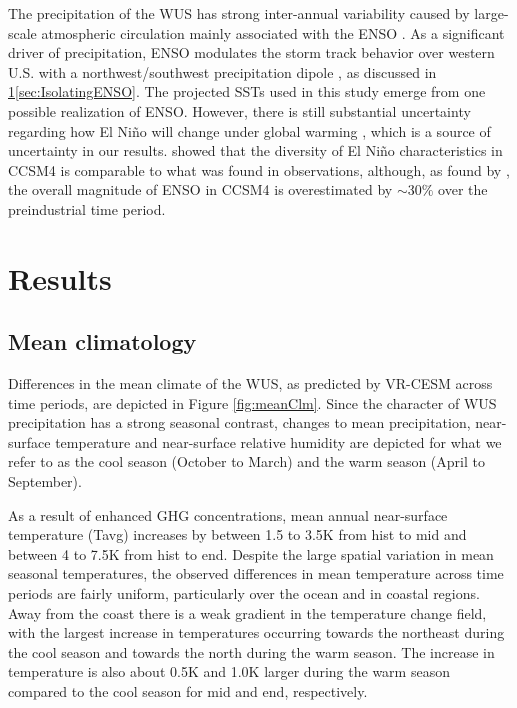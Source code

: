 \documentclass{ametsoc}
\begin{document}
The precipitation of the WUS has strong inter-annual variability caused by large-scale atmospheric circulation mainly associated with the ENSO \citep{leung2003hydroclimate}. As a significant driver of precipitation, ENSO modulates the storm track behavior over western U.S. with a northwest/southwest precipitation dipole \citep{gershunov1998interdecadal}, as discussed in \ref{sec:Results}\ref{sec:IsolatingENSO}. The projected SSTs used in this study emerge from one possible realization of ENSO. However, there is still substantial uncertainty regarding how El Ni\~no will change under global warming \citep{fedorov2000nino, guilyardi2009understanding}, which is a source of uncertainty in our results. \cite{capotondi2013enso} showed that the diversity of El Ni\~no characteristics in CCSM4 is comparable to what was found in observations, although, as found by \cite{deser2012enso}, the overall magnitude of ENSO in CCSM4 is overestimated by $\sim$30$\%$ over the preindustrial time period.


\section{Results} \label{sec:Results}

\subsection{Mean climatology} \label{sec:ResultsMeanClimatology}

Differences in the mean climate of the WUS, as predicted by VR-CESM across time periods, are depicted in Figure \ref{fig:meanClm}. Since the character of WUS precipitation has a strong seasonal contrast, changes to mean precipitation, near-surface temperature and near-surface relative humidity are depicted for what we refer to as the cool season (October to March) and the warm season (April to September).

As a result of enhanced GHG concentrations, mean annual near-surface temperature (Tavg) increases by between 1.5 to 3.5K from \textsf{hist} to \textsf{mid} and between 4 to 7.5K from \textsf{hist} to \textsf{end}. Despite the large spatial variation in mean seasonal temperatures, the observed differences in mean temperature across time periods are fairly uniform, particularly over the ocean and in coastal regions.  Away from the coast there is a weak gradient in the temperature change field, with the largest increase in temperatures occurring towards the northeast during the cool season and towards the north during the warm season.  The increase in temperature is also about 0.5K and 1.0K larger during the warm season compared to the cool season for \textsf{mid} and \textsf{end}, respectively.
\end{document}
